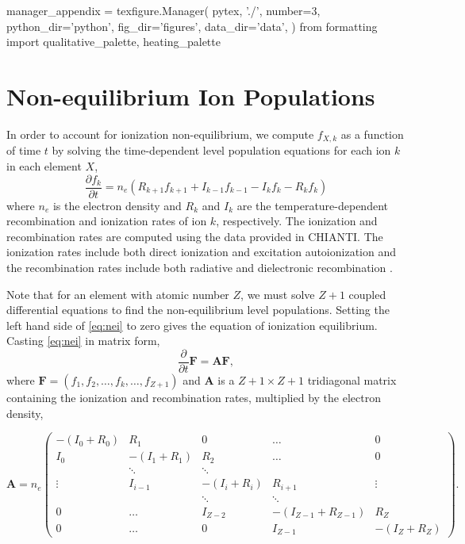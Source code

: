 \begin{pycode}
manager_appendix = texfigure.Manager(
    pytex, './',
    number=3,
    python_dir='python',
    fig_dir='figures',
    data_dir='data',
)
from formatting import qualitative_palette, heating_palette
\end{pycode}
\section{Non-equilibrium Ion Populations}\label{nei}

In order to account for ionization non-equilibrium, we compute $f_{X,k}$ as a function of time $t$ by solving the time-dependent level population equations for each ion $k$ in each element $X$,
\begin{equation}\label{eq:nei}
    \frac{\partial f_k}{\partial t} = n_e(R_{k+1}f_{k+1} + I_{k-1}f_{k-1} - I_kf_k - R_kf_k)
\end{equation}
where $n_e$ is the electron density and $R_k$ and $I_k$ are the temperature-dependent recombination and ionization rates of ion $k$, respectively. The ionization and recombination rates are computed using the data provided in CHIANTI. The ionization rates include both direct ionization and excitation autoionization and the recombination rates include both radiative and dielectronic recombination \citep[see section 6 of][]{young_chianti_2016}.

Note that for an element with atomic number $Z$, we must solve $Z+1$ coupled differential equations to find the non-equilibrium level populations. Setting the left hand side of \autoref{eq:nei} to zero gives the equation of ionization equilibrium. Casting \autoref{eq:nei} in matrix form,
\begin{equation}\label{eq:nei_mat}
    \frac{\partial}{\partial t}\mathbf{F} = \mathbf{A}\mathbf{F},
\end{equation}
where $\mathbf{F}=(f_1,f_2,\ldots,f_k,\ldots,f_{Z+1})$ and $\mathbf{A}$ is a ${Z+1\times Z+1}$ tridiagonal matrix containing the ionization and recombination rates, multiplied by the electron density,

\begin{equation*}
    \mathbf{A} = n_e
        \begin{pmatrix}
            -(I_0 + R_0) & R_1 & 0 & \dots & 0 \\
            I_0 & -(I_1 + R_1) & R_2 & \dots & 0 \\
             & \ddots & \ddots & &  \\
            \vdots & I_{i-1} & -(I_i + R_i) & R_{i+1} & \vdots \\
             & & \ddots & \ddots & \\
            0 & \dots & I_{Z-2} & -(I_{Z-1} + R_{Z-1}) & R_Z \\
            0 & \dots & 0 & I_{Z-1} & -(I_Z + R_Z) 
        \end{pmatrix}.
\end{equation*}


